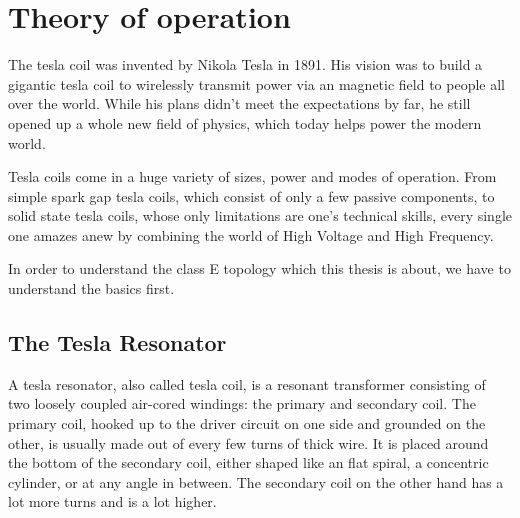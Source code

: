 \setchapterpreamble[u]{\margintoc}
\chapter{Theory of operation}

The tesla coil was invented by Nikola Tesla in 1891. His vision was to build a gigantic tesla coil to wirelessly transmit power via an magnetic field to people all over the world. While his plans didn't meet the expectations by far, he still opened up a whole new field of physics, which today helps power the modern world.

Tesla coils come in a huge variety of sizes, power and modes of operation. From simple spark gap tesla coils, which consist of only a few passive components, to solid state tesla coils, whose only limitations are one's technical skills, every single one amazes anew by combining the world of High Voltage and High Frequency.

In order to understand the class E topology which this thesis is about, we have to understand the basics first. 

\section{The Tesla Resonator}

A tesla resonator, also called tesla coil, is a resonant transformer consisting of two loosely coupled air-cored windings: the primary and secondary coil. The primary coil, hooked up to the driver circuit on one side and grounded on the other, is usually made out of every few turns of thick wire. It is placed around the bottom of the secondary coil, either shaped like an flat spiral, a concentric cylinder, or at any angle in between. The secondary coil on the other hand has a lot more turns and is a lot higher.

